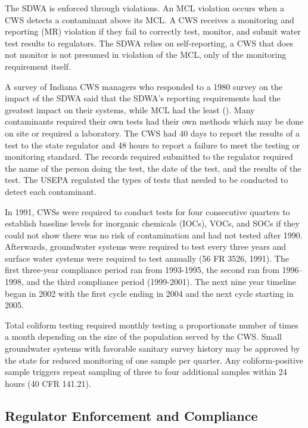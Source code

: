 \documentclass{article}
\begin{document}
The SDWA is enforced through violations. An MCL violation occurs when a CWS detects a contaminant above its MCL. A CWS receives a monitoring and reporting (MR) violation if they fail to correctly test, monitor, and submit water test results to regulators. The SDWA relies on self-reporting, a CWS that does not monitor is not presumed in violation of the MCL, only of the monitoring requirement itself.

A survey of Indiana CWS managers who responded to a 1980 survey on the impact of the SDWA said that the SDWA's reporting requirements had the greatest impact on their systems, while MCL had the least (\cite{oleckno1982national}). Many contaminants required their own tests had their own methods which may be done on site or required a laboratory. The CWS had 40 days to report the results of a test to the state regulator and 48 hours to report a failure to meet the testing or monitoring standard. The records required submitted to the regulator required the name of the person doing the test, the date of the test, and the results of the test. The USEPA regulated the types of tests that needed to be conducted to detect each contaminant.

In 1991, CWSs were required to conduct tests for four consecutive quarters to establish baseline levels for inorganic chemicals (IOCs), VOCs, and SOCs if they could not show there was no risk of contamination and had not tested after 1990. Afterwards, groundwater systems were required to test every three years and surface water systems were required to test annually (56 FR 3526, 1991). The first three-year compliance period ran from 1993-1995, the second ran from 1996–1998, and the third compliance period (1999-2001). The next nine year timeline began in 2002 with the first cycle ending in 2004 and the next cycle starting in 2005.

Total coliform testing required monthly testing a proportionate number of times a month depending on the size of the population served by the CWS.  Small groundwater systems with favorable sanitary survey history may be approved by the state for reduced monitoring of one sample per quarter. Any coliform-positive sample triggers repeat sampling of three to four additional samples within 24 hours (40 CFR 141.21).

\subsection{Regulator Enforcement and Compliance}
\end{document}
